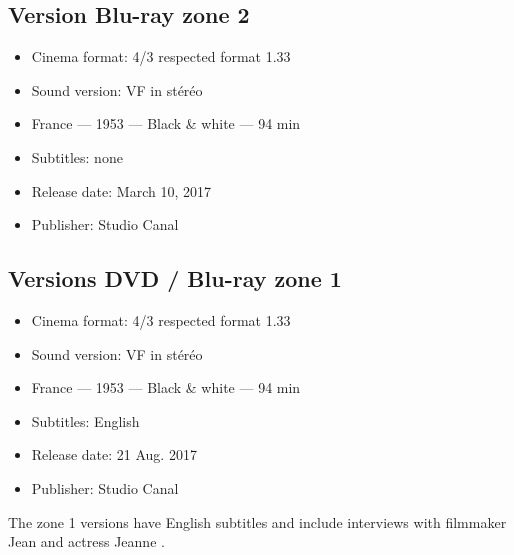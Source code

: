 \subsection*{Version Blu-ray zone 2}

\begin{itemize}
	\item Cinema format: 4/3 respected format 1.33
	\item Sound version: VF in stéréo
	\item France --- 1953 --- Black \& white --- 94 min
	\item Subtitles: none
	\item Release date: March 10, 2017
	\item Publisher: Studio Canal
\end{itemize}

\subsection*{Versions DVD / Blu-ray zone 1}

\begin{itemize}
	\item Cinema format: 4/3 respected format 1.33
	\item Sound version: VF in stéréo
	\item France --- 1953 --- Black \& white --- 94 min
	\item Subtitles: English
	\item Release date: 21 Aug. 2017
	\item Publisher: Studio Canal
\end{itemize}

The zone 1 versions have English subtitles and include interviews with filmmaker Jean  and actress Jeanne .

